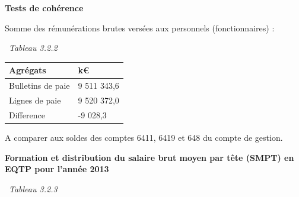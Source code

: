 \textbf{Tests de cohérence}

Somme des rémunérations brutes versées aux personnels (fonctionnaires) :

~\emph{Tableau 3.2.2}

\begin{longtable}[]{@{}ll@{}}
\toprule
Agrégats & k€\tabularnewline
\midrule
\endhead
Bulletins de paie & 9 511 343,6\tabularnewline
Lignes de paie & 9 520 372,0\tabularnewline
Difference & -9 028,3\tabularnewline
\bottomrule
\end{longtable}

A comparer aux soldes des comptes 6411, 6419 et 648 du compte de
gestion.

\textbf{Formation et distribution du salaire brut moyen par tête (SMPT)
en EQTP pour l'année 2013 }

~\emph{Tableau 3.2.3}

